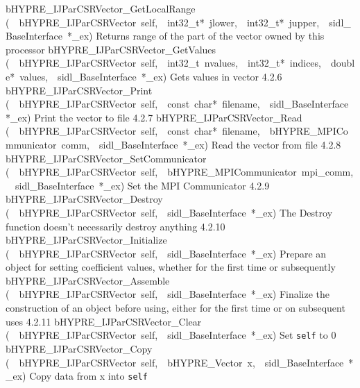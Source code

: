 \documentclass{article}
\begin{document}
\begin{cxxentry}
\begin{cxxentry}
\begin{cxxnames}
        {bHYPRE\_IJParCSRVector\_GetLocalRange}
        {(\ \ bHYPRE\_IJParCSRVector\ self,\ \ int32\_t*\ jlower,\ \ int32\_t*\ jupper,\ \ sidl\_BaseInterface\ *\_ex)}
        {
Returns range of the part of the vector owned by this
processor}
        {}
\label{cxx.4.2.18}
        {bHYPRE\_IJParCSRVector\_GetValues}
        {(\ \ bHYPRE\_IJParCSRVector\ self,\ \ int32\_t\ nvalues,\ \ int32\_t*\ indices,\ \ double*\ values,\ \ sidl\_BaseInterface\ *\_ex)}
        {
Gets values in vector}
        {4.2.6}
        {bHYPRE\_IJParCSRVector\_Print}
        {(\ \ bHYPRE\_IJParCSRVector\ self,\ \ const\ char*\ filename,\ \ sidl\_BaseInterface\ *\_ex)}
        {
Print the vector to file}
        {4.2.7}
        {bHYPRE\_IJParCSRVector\_Read}
        {(\ \ bHYPRE\_IJParCSRVector\ self,\ \ const\ char*\ filename,\ \ bHYPRE\_MPICommunicator\ comm,\ \ sidl\_BaseInterface\ *\_ex)}
        {
Read the vector from file}
        {4.2.8}
        {bHYPRE\_IJParCSRVector\_SetCommunicator}
        {(\ \ bHYPRE\_IJParCSRVector\ self,\ \ bHYPRE\_MPICommunicator\ mpi\_comm,\ \ sidl\_BaseInterface\ *\_ex)}
        {
Set the MPI Communicator}
        {4.2.9}
        {bHYPRE\_IJParCSRVector\_Destroy}
        {(\ \ bHYPRE\_IJParCSRVector\ self,\ \ sidl\_BaseInterface\ *\_ex)}
        {
The Destroy function doesn't necessarily destroy anything}
        {4.2.10}
        {bHYPRE\_IJParCSRVector\_Initialize}
        {(\ \ bHYPRE\_IJParCSRVector\ self,\ \ sidl\_BaseInterface\ *\_ex)}
        {
Prepare an object for setting coefficient values, whether for
the first time or subsequently}
        {}
\label{cxx.4.2.19}
        {bHYPRE\_IJParCSRVector\_Assemble}
        {(\ \ bHYPRE\_IJParCSRVector\ self,\ \ sidl\_BaseInterface\ *\_ex)}
        {
Finalize the construction of an object before using, either
for the first time or on subsequent uses}
        {4.2.11}
        {bHYPRE\_IJParCSRVector\_Clear}
        {(\ \ bHYPRE\_IJParCSRVector\ self,\ \ sidl\_BaseInterface\ *\_ex)}
        {
Set {\tt self} to 0}
        {}
\label{cxx.4.2.20}
        {bHYPRE\_IJParCSRVector\_Copy}
        {(\ \ bHYPRE\_IJParCSRVector\ self,\ \ bHYPRE\_Vector\ x,\ \ sidl\_BaseInterface\ *\_ex)}
        {
Copy data from x into {\tt self}}
        {}

\end{cxxnames}
\end{cxxentry}
\end{cxxentry}
\end{document}
